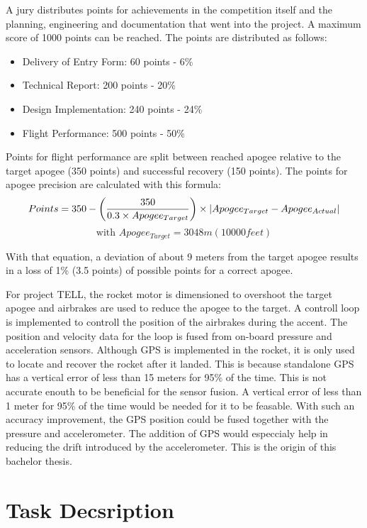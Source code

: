 \vspace{0.5cm}

A jury distributes points for achievements in the competition itself and the planning, engineering and documentation that went into the project.
A maximum score of 1000 points can be reached.
The points are distributed as follows:
\begin{itemize}
 \item Delivery of Entry Form: 60 points - 6\%
 \item Technical Report: 200 points - 20\%
 \item Design Implementation: 240 points - 24\%
 \item Flight Performance: 500 points - 50\%
\end{itemize}

Points for flight performance are split between reached apogee relative to the target apogee (350 points) and successful recovery (150 points).
The points for apogee precision are calculated with this formula:
$$ Points = 350 - \left( \frac{350}{0.3 \times Apogee_{Target}} \right) \times \abs{Apogee_{Target} - Apogee_{Actual}} $$
$$ \text{with } Apogee_{Target} = 3048m(10000feet)$$ 

With that equation, a deviation of about 9 meters from the target apogee results in a loss of 1\% (3.5 points) of possible points for a correct apogee. \cite{sac_rules2017}

For project TELL, the rocket motor is dimensioned to overshoot the target apogee and airbrakes are used to reduce the apogee to the target.
A controll loop is implemented to controll the position of the airbrakes during the accent.
The position and velocity data for the loop is fused from on-board pressure and acceleration sensors.
Although GPS is implemented in the rocket, it is only used to locate and recover the rocket after it landed.
This is because standalone GPS has a vertical error of less than 15 meters for 95\% of the time. \cite{SPS_Performance}
This is not accurate enouth to be beneficial for the sensor fusion.
A vertical error of less than 1 meter for 95\% of the time would be needed for it to be feasable.
With such an accuracy improvement, the GPS position could be fused together with the pressure and accelerometer.
The addition of GPS would especcialy help in reducing the drift introduced by the accelerometer.
This is the origin of this bachelor thesis.


\section{Task Decsription}

